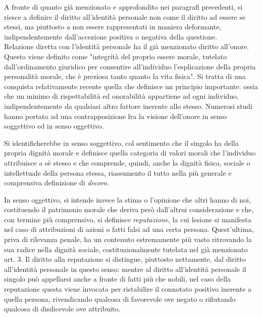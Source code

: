 A fronte di quanto già menzionato e approfondito nei paragrafi precedenti, si riesce a definire il diritto all’identità personale non come il diritto ad essere se stessi, ma piuttosto a non essere rappresentati in maniera deformante, indipendentemente dall'accezione positiva o negativa della questione.
\\Relazione diretta con l'identità personale ha il già menzionato diritto all’onore. 
\\Questo viene definito come "integrità del proprio essere morale, tutelato dall’ordinamento giuridico per consentire all’individuo l’esplicazione della propria personalità morale, che è preziosa tanto quanto la vita fisica". Si tratta di una conquista relativamente recente quella che definisce un principio importante: ossia che un minimo di rispettabilità ed onorabilità appartiene ad ogni individuo, indipendentemente da qualsiasi altro fattore inerente allo stesso. Numerosi studi hanno portato ad una contrapposizione fra la visione dell'onore in senso soggettivo ed in senso oggettivo.

Si identificherebbe in senso soggettivo, col sentimento che il singolo ha della propria dignità morale e definisce quella categoria di valori morali che l’individuo attribuisce a sè stesso e che comprende, quindi, anche la dignità fisica, sociale o intellettuale della persona stessa, riassumento il tutto nella più generale e comprensiva definizione di \textit{decoro}. 

In senso oggettivo, si intende invece la stima o l’opinione che altri hanno di noi, costituendo il patrimonio morale che deriva però dall’altrui considerazione e che, con termine più comprensivo, si definisce \textit{reputazione}, la cui lesione si manifesta nel caso di attribuzioni di azioni o fatti falsi ad una certa persona. Quest'ultima, priva di rilevanza penale, ha un contenuto estremamente più vasto ritrovando la sua radice nella dignità sociale, costituzionalmente tutelata nel già menzionato art. 3.
Il diritto alla reputazione si distingue, piuttosto nettamente, dal diritto all'identità personale in questo senso: mentre al diritto all'identità personale il singolo può appellarsi anche a fronte di fatti più che nobili, nel caso della reputazione questa viene invocata per ristabilire il connotato positivo inerente a quella persona, rivendicando qualcosa di favorevole ove negato o rifiutando qualcosa di disdicevole ove attribuito.

